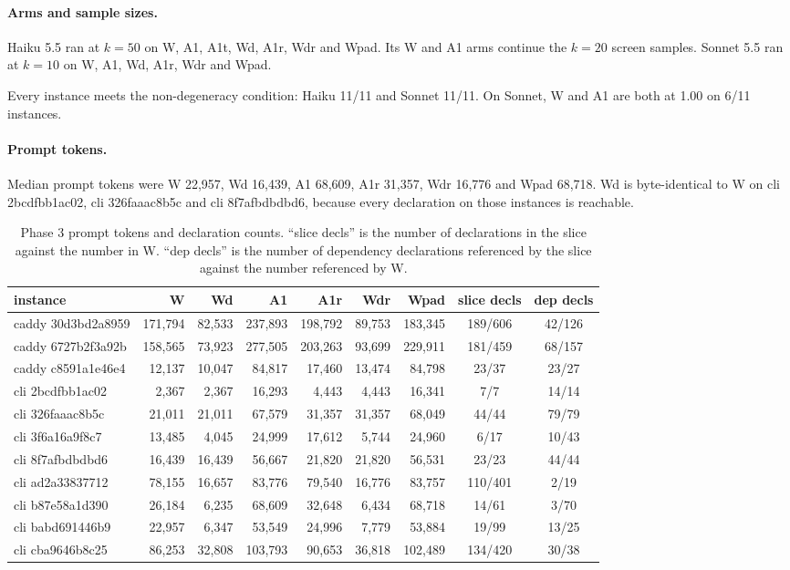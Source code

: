\documentclass[11pt,a4paper]{article}
\begin{document}
\paragraph{Arms and sample sizes.}
Haiku 5.5 ran at $k=50$ on W, A1, A1t, Wd, A1r, Wdr and Wpad. Its W and A1 arms continue the $k=20$ screen samples. Sonnet 5.5 ran at $k=10$ on W, A1, Wd, A1r, Wdr and Wpad.

Every instance meets the non-degeneracy condition: Haiku 11/11 and Sonnet 11/11. On Sonnet, W and A1 are both at 1.00 on 6/11 instances.

\paragraph{Prompt tokens.}
Median prompt tokens were W 22,957, Wd 16,439, A1 68,609, A1r 31,357, Wdr 16,776 and Wpad 68,718. Wd is byte-identical to W on cli 2bcdfbb1ac02, cli 326faaac8b5c and cli 8f7afbdbdbd6, because every declaration on those instances is reachable.

\begin{table}[h]
\centering
\caption{Phase 3 prompt tokens and declaration counts. ``slice decls'' is the number of declarations in the slice against the number in W. ``dep decls'' is the number of dependency declarations referenced by the slice against the number referenced by W.}
\label{tab:p3tok}
\small
\begin{tabular}{lrrrrrrcc}
\toprule
instance & W & Wd & A1 & A1r & Wdr & Wpad & slice decls & dep decls\\
\midrule
caddy 30d3bd2a8959 & 171,794 & 82,533 & 237,893 & 198,792 & 89,753 & 183,345 & 189/606 & 42/126\\
caddy 6727b2f3a92b & 158,565 & 73,923 & 277,505 & 203,263 & 93,699 & 229,911 & 181/459 & 68/157\\
caddy c8591a1e46e4 & 12,137 & 10,047 & 84,817 & 17,460 & 13,474 & 84,798 & 23/37 & 23/27\\
cli 2bcdfbb1ac02 & 2,367 & 2,367 & 16,293 & 4,443 & 4,443 & 16,341 & 7/7 & 14/14\\
cli 326faaac8b5c & 21,011 & 21,011 & 67,579 & 31,357 & 31,357 & 68,049 & 44/44 & 79/79\\
cli 3f6a16a9f8c7 & 13,485 & 4,045 & 24,999 & 17,612 & 5,744 & 24,960 & 6/17 & 10/43\\
cli 8f7afbdbdbd6 & 16,439 & 16,439 & 56,667 & 21,820 & 21,820 & 56,531 & 23/23 & 44/44\\
cli ad2a33837712 & 78,155 & 16,657 & 83,776 & 79,540 & 16,776 & 83,757 & 110/401 & 2/19\\
cli b87e58a1d390 & 26,184 & 6,235 & 68,609 & 32,648 & 6,434 & 68,718 & 14/61 & 3/70\\
cli babd691446b9 & 22,957 & 6,347 & 53,549 & 24,996 & 7,779 & 53,884 & 19/99 & 13/25\\
cli cba9646b8c25 & 86,253 & 32,808 & 103,793 & 90,653 & 36,818 & 102,489 & 134/420 & 30/38\\
\bottomrule
\end{tabular}
\end{table}
\end{document}
